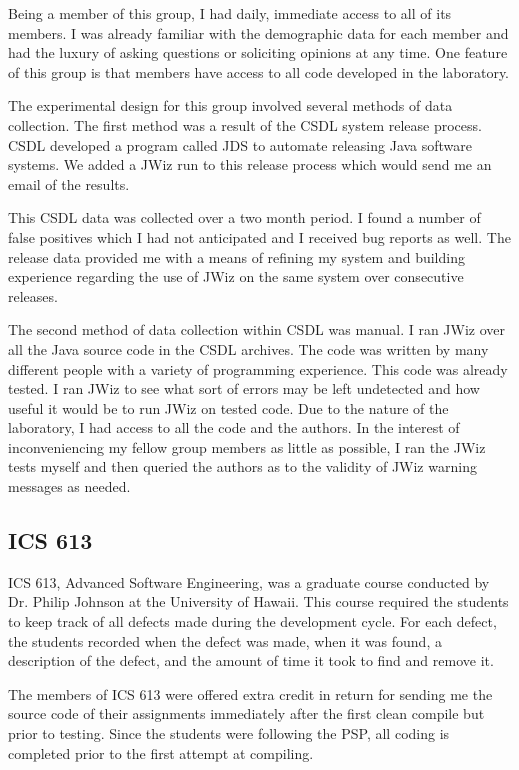 Being a member of this group, I had daily, immediate access to all of its
members.  I was already familiar with the demographic data for each member
and had the luxury of asking questions or soliciting opinions at any time.
One feature of this group is that members have access to all code developed
in the laboratory.

The experimental design for this group involved several methods of data
collection.  The first method was a result of the CSDL system
release process.  CSDL developed a program called JDS to automate releasing
Java software systems.  We added a JWiz run to this release process which
would send me an email of the results.  

This CSDL data was collected over a two month period.  I found a number of
false positives which I had not anticipated and I received bug reports as
well.  The release data provided me with a means of refining my system and
building experience regarding the use of JWiz on the same system over
consecutive releases.

The second method of data collection within CSDL was manual.  I ran JWiz
over all the Java source code in the CSDL archives.  The code was written
by many different people with a variety of programming experience.  This
code was already tested.  I ran JWiz to see what sort of errors may be left
undetected and how useful it would be to run JWiz on tested code.  Due to
the nature of the laboratory, I had access to all the code and the authors.
In the interest of inconveniencing my fellow group members as little as
possible, I ran the JWiz tests myself and then queried the authors as to
the validity of JWiz warning messages as needed.

\subsection{ICS 613} 
ICS 613, Advanced Software Engineering, was a graduate course conducted by
Dr. Philip Johnson at the University of Hawaii.  This course required the
students to keep track of all defects made during the development cycle.
For each defect, the students recorded when the defect was made, when it
was found, a description of the defect, and the amount of time it took to
find and remove it.

The members of ICS 613 were offered extra credit in return for sending
me the source code of their assignments immediately after the first clean
compile but prior to testing.  Since the students were following the PSP,
all coding is completed prior to the first attempt at compiling.

